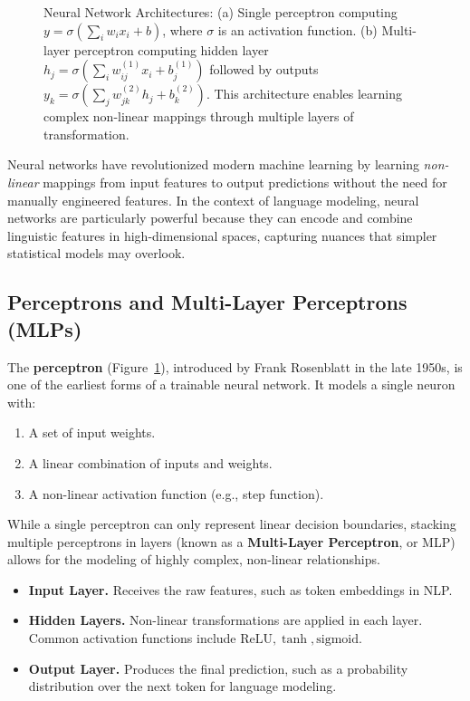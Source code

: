 \begin{figure}[htbp]
\caption{Neural Network Architectures: (a) Single perceptron computing $y = \sigma(\sum_{i} w_i x_i + b)$, where $\sigma$ is an activation function. 
(b) Multi-layer perceptron computing hidden layer $h_j = \sigma(\sum_{i} w^{(1)}_{ij} x_i + b^{(1)}_j)$ followed by outputs 
$y_k = \sigma(\sum_{j} w^{(2)}_{jk} h_j + b^{(2)}_k)$. This architecture enables learning complex non-linear mappings through multiple layers of transformation.}
\label{fig:neural_architectures}
\end{figure}

\noindent
Neural networks have revolutionized modern machine learning by learning \emph{non-linear} mappings from input features to output predictions without the need for manually engineered features. In the context of language modeling, neural networks are particularly powerful because they can encode and combine linguistic features in high-dimensional spaces, capturing nuances that simpler statistical models may overlook.

\subsection{Perceptrons and Multi-Layer Perceptrons (MLPs)}
\noindent
The \textbf{perceptron} (Figure~\ref{fig:neural_architectures}), introduced by Frank Rosenblatt in the late 1950s, is one of the earliest forms of a trainable neural network. It models a single neuron with:
\begin{enumerate}
    \item A set of input weights.
    \item A linear combination of inputs and weights.
    \item A non-linear activation function (e.g., step function).
\end{enumerate}
While a single perceptron can only represent linear decision boundaries, stacking multiple perceptrons in layers (known as a \textbf{Multi-Layer Perceptron}, or MLP) allows for the modeling of highly complex, non-linear relationships.

\begin{itemize}
    \item \textbf{Input Layer.} Receives the raw features, such as token embeddings in NLP.
    \item \textbf{Hidden Layers.} Non-linear transformations are applied in each layer. Common activation functions include $\text{ReLU}, \tanh, \text{sigmoid}$.
    \item \textbf{Output Layer.} Produces the final prediction, such as a probability distribution over the next token for language modeling.
\end{itemize}

